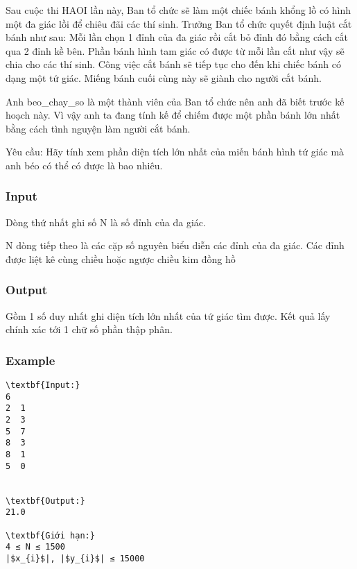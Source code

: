 



   Sau cuộc thi HAOI lần này, Ban tổ chức sẽ làm một chiếc bánh khổng lồ có hình một đa giác lồi để chiêu đãi các thí sinh. Trưởng Ban tổ chức quyết định luật cắt bánh như sau: Mỗi lần chọn 1 đỉnh của đa giác rồi cắt bỏ đỉnh đó bằng cách cắt qua 2 đỉnh kề bên. Phần bánh hình tam giác có được từ mỗi lần cắt như vậy sẽ chia cho các thí sinh. Công việc cắt bánh sẽ tiếp tục cho đến khi chiếc bánh có dạng một tứ giác. Miếng bánh cuối cùng này sẽ giành cho người cắt bánh.  

   Anh beo\_chay\_so là một thành viên của Ban tổ chức nên anh đã biết trước kế hoạch này. Vì vậy anh ta đang tính kế để chiếm được một phần bánh lớn nhất bằng cách tình nguyện làm người cắt bánh.  

   Yêu cầu: Hãy tính xem phần diện tích lớn nhất của miến bánh hình tứ giác mà anh béo có thể có được là bao nhiêu.  

\subsubsection{   Input  }

   Dòng thứ nhất ghi số N là số đỉnh của đa giác.  

   N dòng tiếp theo là các cặp số nguyên biểu diễn các đỉnh của đa giác. Các đỉnh được liệt kê cùng chiều hoặc ngược chiều kim đồng hồ  

\subsubsection{   Output  }

   Gồm 1 số duy nhất ghi diện tích lớn nhất của tứ giác tìm được. Kết quả lấy chính xác tới 1 chữ số phần thập phân.  

\subsubsection{   Example  }
\begin{verbatim}
\textbf{Input:}
6
2  1
2  3
5  7
8  3
8  1
5  0


\textbf{Output:}
21.0

\textbf{Giới hạn:}
4 ≤ N ≤ 1500 
|$x_{i}$|, |$y_{i}$| ≤ 15000 
\end{verbatim}
